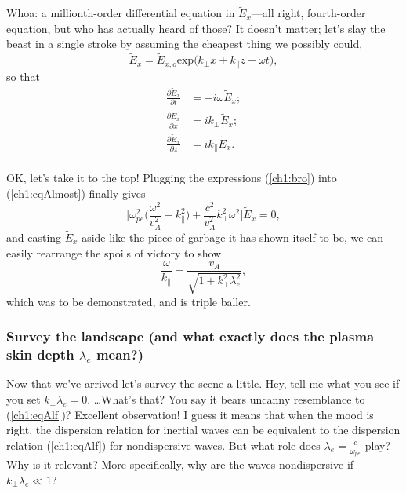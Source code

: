 Whoa: a millionth-order differential equation in $\tilde E_x$---all right,
fourth-order equation, but who has actually heard of those? It doesn't matter;
let's slay the beast in a single stroke by assuming the cheapest thing we possibly could,
\begin{equation*}
  \tilde E_x = \tilde E_{x,o} \mathrm{exp} \Big ( k_\perp x + k_\parallel z - \omega t \Big ),
\end{equation*}
so that 
\begin{equation} \label{ch1:bro}
  \begin{alignedat}{2}
\frac{\partial \tilde E_x}{\partial t} &=  -i \omega \tilde E_x; \\
\frac{\partial \tilde E_x}{\partial x} &=   i k_\perp \tilde E_x; \\
\frac{\partial \tilde E_x}{\partial z} &=   i k_\parallel \tilde E_x. \\
  \end{alignedat}
\end{equation}

OK, let's take it to the top! Plugging the expressions (\ref{ch1:bro}) into
(\ref{ch1:eqAlmost}) finally gives
\begin{equation} \label{ch1:bro}
  \Big [ \omega_{pe}^2 \Big ( \dfrac{\omega^2}{v_A^2} - k_\parallel^2 \Big ) + \dfrac{c^2}{v_A^2} k_\perp^2 \omega^2 \Big ] \tilde E_x = 0,
\end{equation}
and casting $\tilde E_x$ aside like the piece of garbage it has shown itself to
be, we can easily rearrange the spoils of victory to show
\begin{equation}
  \dfrac{\omega}{k_\parallel} = \dfrac{v_A}{ \sqrt{1 + k_\perp^2 \lambda_e^2 }},
\end{equation}
which was to be demonstrated, and is triple baller. 

\subsubsection{Survey the landscape (and what exactly does the plasma skin depth $\lambda_e$ mean?) } 

Now that we've arrived let's survey the scene a little. Hey, tell me what you
see if you set $k_\perp \lambda_e = 0$. \dots What's that? You say it bears
uncanny resemblance to (\ref{ch1:eqAlf})? Excellent observation! I guess it
means that when the mood is right, the dispersion relation for inertial \Alf
waves can be equivalent to the dispersion relation (\ref{ch1:eqAlf}) for
nondispersive \Alf waves. But what role does $\lambda_e = \frac{c}{\omega_{pe}}$
play?  Why is it relevant? More specifically, why are the waves nondispersive if
$k_\perp \lambda_e \ll 1$?

